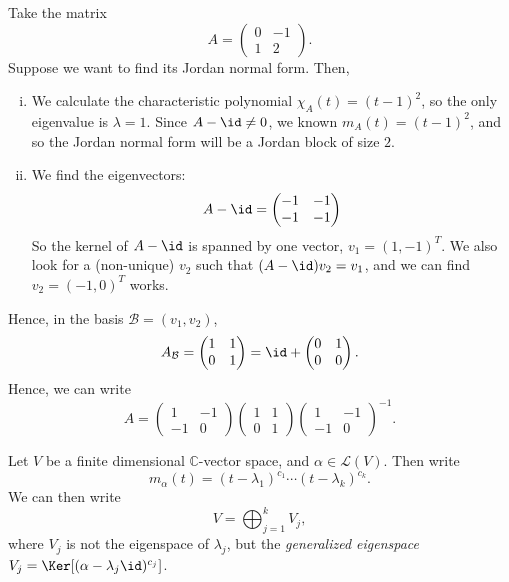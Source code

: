 \documentclass[12pt]{article}
\begin{document}
\begin{exbox}
	Take the matrix
	\[
	A =
	\begin{pmatrix}
		0 & -1 \\
		1 & 2
	\end{pmatrix}
	.\]
	Suppose we want to find its Jordan normal form. Then,
	\begin{enumerate}[(i)]
		\item We calculate the characteristic polynomial $\chi_{A}(t) = (t - 1)^2$, so the only eigenvalue is $\lambda = 1$. Since $A - \id \neq 0$, we known $m_{A}(t) = (t - 1)^2$, and so the Jordan normal form will be a Jordan block of size $2$.
		\item We find the eigenvectors:
			\[
			A - \id =
			\begin{pmatrix}
				-1 & -1 \\
				-1 & -1
			\end{pmatrix}
			\]
			So the kernel of $A - \id$ is spanned by one vector, $v_1 = (1, -1)^{T}$. We also look for a (non-unique) $v_2$ such that $(A - \id)v_2 = v_1$, and we can find $v_2 = (-1, 0)^{T}$ works.
	\end{enumerate}
	Hence, in the basis $\mathcal{B} = (v_1, v_2)$,
	\[
	A_{\mathcal{B}} =
	\begin{pmatrix}
		1 & 1 \\
		0 & 1
	\end{pmatrix}
	= \id +
	\begin{pmatrix}
		0 & 1 \\ 
		0 & 0
	\end{pmatrix}
	.\]
	Hence, we can write
	\[
	A =
	\begin{pmatrix}
		1 & -1 \\
		-1 & 0
	\end{pmatrix}
	\begin{pmatrix}
		1 & 1 \\
		0 & 1
	\end{pmatrix}
	\begin{pmatrix}
		1 & -1 \\
		-1 & 0
	\end{pmatrix}^{-1}
	.\]
\end{exbox}

\begin{theorem}
	Let $V$ be a finite dimensional $\mathbb{C}$-vector space, and $\alpha \in \mathcal{L}(V)$. Then write
	\[
		m_{\alpha}(t) = (t - \lambda_1)^{c_1} \cdots (t - \lambda_k)^{c_k}
	.\]
	We can then write
	\[
	V = \bigoplus_{j = 1}^{k}V_j
	,\]
	where $V_j$ is not the eigenspace of $\lambda_j$, but the \textit{generalized eigenspace} $V_j = \Ker[(\alpha - \lambda_j \id)^{c_j}]$.
\end{theorem}
\end{document}
